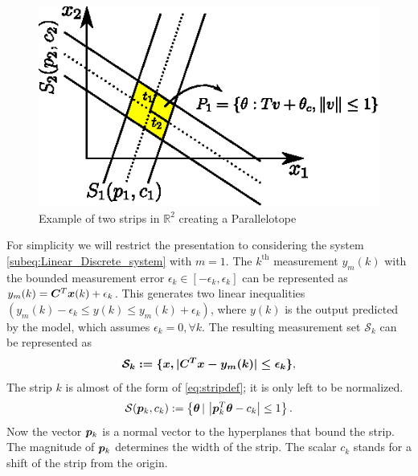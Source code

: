 \documentclass{ifacconf}
\def\ve#1{\mathchoice{\mbox{\boldmath$\displaystyle#1$}}
{\mbox{\boldmath$\textstyle#1$}}
{\mbox{\boldmath$\scriptstyle#1$}}
{\mbox{\boldmath$\scriptscriptstyle#1$}}}
\begin{document}
\\
\begin{figure}
  \centering
  \includegraphics[width=0.92\linewidth]{StripInter}
  \caption{Example of two strips in $\mathbb{R}^{2}$ creating a Parallelotope}
  \label{fig:StripInter}
\end{figure}
%
For simplicity we will restrict the presentation to considering the system \eqref{subeq:Linear_Discrete_system} with $m=1$. The $k^\mathrm{th}$ measurement $y_{m}(k)$ with the bounded measurement error $\epsilon_k \in [-\epsilon_k ,\epsilon_k]$ can be represented as $y_{m}(k) = \ve C^T \ve x(k) + \epsilon_k$. This generates two linear inequalities $(y_{m}(k)-\epsilon_{k} \leq y(k) \leq y_m(k)+\epsilon_k)$, where $y(k)$ is the output predicted by the model, which assumes $\epsilon_k=0,\forall k$. The resulting measurement set $\mathcal{S}_k$ can be represented as
\begin{align}
 \label{eq:Strip_measurement}
 \ve{\mathcal{S}_{k} := \{ x,|C^{T}x - y_m(k)| \leq \epsilon_k \}},
\end{align}
The strip $k$ is almost of the form of \ref{eq:stripdef}; it is only left to be normalized.
\begin{align}
 \label{eq:Strip}
 \mathcal{S}(\ve p_k,c_k):= \left\{\ve\theta\,|\, \left|\ve p_k^T \ve\theta - c_k \right| \leq 1\right\}.
\end{align}
Now the vector $\ve p_k$ is a normal vector to the hyperplanes that bound the strip. The magnitude of $\ve p_k$ determines the width of the strip. The scalar $c_k$ stands for a shift of the strip from the origin.
\end{document}
